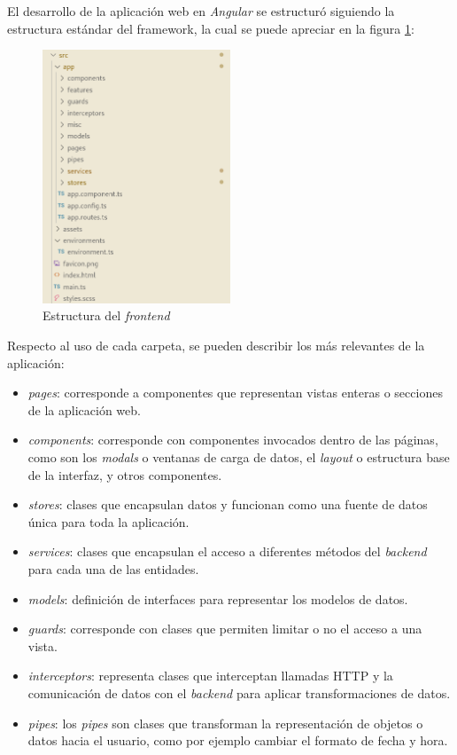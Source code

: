 El desarrollo de la aplicación web en \textit{Angular} se estructuró siguiendo la estructura estándar del framework\citep{ANGULAR:4}, la cual se puede apreciar en la figura \ref{frontend:folder}:

\begin{figure}[H]
	\centering
	\includegraphics[width=0.5\textwidth]{./Figures/frontend-folder.png}
	\caption{Estructura del \textit{frontend}}
	\label{frontend:folder}
\end{figure}

Respecto al uso de cada carpeta, se pueden describir los más relevantes de la aplicación:
\begin{itemize}
	\item \textit{pages}: corresponde a componentes que representan vistas enteras o secciones de la aplicación web.
	\item \textit{components}: corresponde con componentes invocados dentro de las páginas, como son los \textit{modals} o ventanas de carga de datos, el \textit{layout} o estructura base de la interfaz, y otros componentes.
	\item \textit{stores}: clases que encapsulan datos y funcionan como una fuente de datos única para toda la aplicación\citep{NGRX:1}.
	\item \textit{services}: clases que encapsulan el acceso a diferentes métodos del \textit{backend} para cada una de las entidades.
	\item \textit{models}: definición de interfaces para representar los modelos de datos.
	\item \textit{guards}: corresponde con clases que permiten limitar o no el acceso a una vista.
	\item \textit{interceptors}:	representa clases que interceptan llamadas HTTP y la comunicación de datos con el \textit{backend} para aplicar transformaciones de datos.
	\item \textit{pipes}: los \textit{pipes} son clases que transforman la representación de objetos o datos hacia el usuario, como por ejemplo cambiar el formato de fecha y hora\citep{ANGULAR:5}.
\end{itemize}

